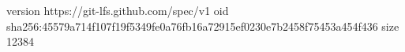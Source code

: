 version https://git-lfs.github.com/spec/v1
oid sha256:45579a714f107f19f5349fe0a76fb16a72915ef0230e7b2458f75453a454f436
size 12384
